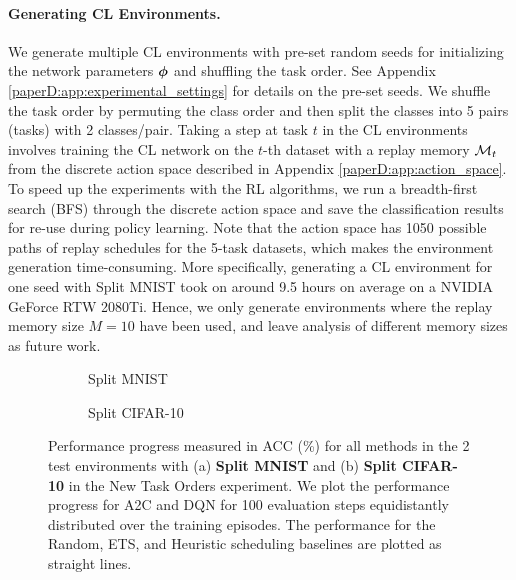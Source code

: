 \paragraph{Generating CL Environments.} We generate multiple CL environments with pre-set random seeds for initializing the network parameters ${\bm{\phi}}$ and shuffling the task order. See Appendix \ref{paperD:app:experimental_settings} for details on the pre-set seeds. 
We shuffle the task order by permuting the class order and then split the classes into 5 pairs (tasks) with 2 classes/pair. 
Taking a step at task $t$ in the CL environments involves training the CL network on the $t$-th dataset with a replay memory ${\mathcal{M}}_t$ from the discrete action space described in Appendix \ref{paperD:app:action_space}. 
To speed up the experiments with the RL algorithms, we run a breadth-first search (BFS) through the discrete action space and save the classification results for re-use during policy learning. Note that the action space has 1050 possible paths of replay schedules for the 5-task datasets, which makes the environment generation time-consuming. More specifically, generating a CL environment for one seed with Split MNIST took on around 9.5 hours on average on a NVIDIA GeForce RTW 2080Ti.   
Hence, we only generate environments where the replay memory size $M=10$ have been used, and leave analysis of different memory sizes as future work. 

\begin{figure}[t]
	\centering
	\setlength{\figwidth}{0.26\textwidth}
	\setlength{\figheight}{.14\textheight}
	\begin{subfigure}[t]{0.48\textwidth}
		\centering
		
		\vspace{-4mm} %
		\caption{Split MNIST}
		\label{fig:rewards_mnist_2envs}
	\end{subfigure}%
	\begin{subfigure}[t]{0.48\textwidth}
		\centering
		
		\caption{Split CIFAR-10}
		\label{fig:rewards_cifar10_2envs}
	\end{subfigure}
	\vspace{-1mm}
	\caption{Performance progress measured in ACC (\%) for all methods in the 2 test environments with (a) {\bf Split MNIST} and (b) {\bf Split CIFAR-10} in the New Task Orders experiment. We plot the performance progress for A2C and DQN for 100 evaluation steps equidistantly distributed over the training episodes. The performance for the Random, ETS, and Heuristic scheduling baselines are plotted as straight lines.  }
	\label{fig:rewards_new_task_orders_2envs}
	\vspace{-2mm}
\end{figure}


